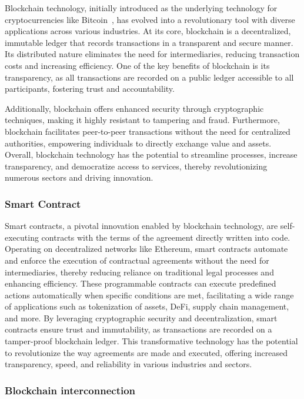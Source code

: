 \documentclass[conference]{IEEEtran}
\begin{document}
Blockchain technology, initially introduced as the underlying technology for cryptocurrencies like Bitcoin~\cite{Nakamoto2008BitcoinPeerToPeer}, has evolved into a revolutionary tool with diverse applications across various industries. At its core, blockchain is a decentralized, immutable ledger that records transactions in a transparent and secure manner. Its distributed nature eliminates the need for intermediaries, reducing transaction costs and increasing efficiency. One of the key benefits of blockchain is its transparency, as all transactions are recorded on a public ledger accessible to all participants, fostering trust and accountability.

Additionally, blockchain offers enhanced security through cryptographic techniques, making it highly resistant to tampering and fraud. Furthermore, blockchain facilitates peer-to-peer transactions without the need for centralized authorities, empowering individuals to directly exchange value and assets. Overall, blockchain technology has the potential to streamline processes, increase transparency, and democratize access to services, thereby revolutionizing numerous sectors and driving innovation.

\subsubsection{Smart Contract}

Smart contracts, a pivotal innovation enabled by blockchain technology, are self-executing contracts with the terms of the agreement directly written into code. Operating on decentralized networks like Ethereum, smart contracts automate and enforce the execution of contractual agreements without the need for intermediaries, thereby reducing reliance on traditional legal processes and enhancing efficiency. These programmable contracts can execute predefined actions automatically when specific conditions are met, facilitating a wide range of applications such as tokenization of assets, DeFi, supply chain management, and more. By leveraging cryptographic security and decentralization, smart contracts ensure trust and immutability, as transactions are recorded on a tamper-proof blockchain ledger. This transformative technology has the potential to revolutionize the way agreements are made and executed, offering increased transparency, speed, and reliability in various industries and sectors.

\subsubsection{Blockchain interconnection}
\end{document}
